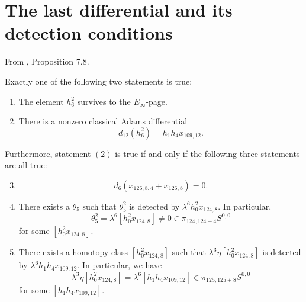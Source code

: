 \section{The last differential and its detection conditions}

\begin{proposition}
\label{paper:7.8}
From \cite{LWX126}, Proposition 7.8.\par
\label{prop:possible_h_6_sq}\label{prop:possibleh62}
Exactly one of the following two statements is true:
\begin{enumerate}
    \item The element $h_6^2$ survives to the $E_\infty$-page.
   
    \item There is a nonzero classical Adams differential 
    $$d_{12}(h_6^2) = h_1h_4x_{109,12}.$$
\end{enumerate}
Furthermore, statement $(2)$ is true if and only if the following three statements are all true:
\begin{enumerate} \setcounter{enumi}{2}
    \item \leavevmode\vspace*{-\dimexpr\abovedisplayskip + \baselineskip}  
    $$d_6(x_{126,8,4} + x_{126,8}) = 0.$$
    
    \item There exists a $\theta_5$ such that 
    $\theta_5^2$ is detected by $\lambda^6 h_0^2x_{124,8}$. In particular, 
    $$\theta_5^2 = \lambda^6 [h_0^2x_{124,8}] \neq 0 \in \pi_{124,124+4}S^{0,0}$$
    for some $[h_0^2x_{124,8}]$.

    \item There exists a homotopy class $[h_0^2x_{124,8}]$ such that
    $\lambda^3 \eta [h_0^2x_{124,8}]$ is detected by $\lambda^6 h_1h_4x_{109,12}$. In particular, we have 
    $$\lambda^3 \eta [h_0^2x_{124,8}] = \lambda^6 [h_1h_4x_{109,12}] \in \pi_{125,125+8} S^{0,0}$$
    for some $[h_1h_4x_{109,12}]$.
\end{enumerate}


\end{proposition}
